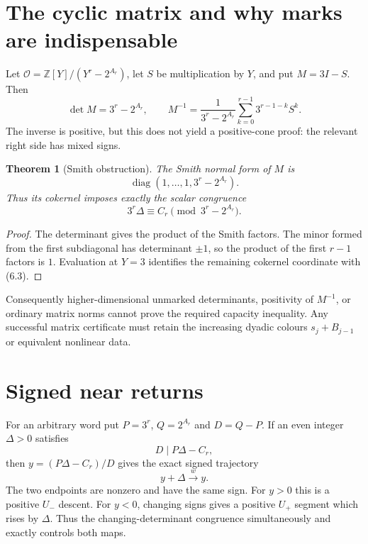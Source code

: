 \documentclass[11pt,reqno]{amsart}
\newtheorem{theorem}{Theorem}[section]
\theoremstyle{remark}
\newcommand{\Z}{\mathbb Z}
\newcommand{\Up}{U_{+}}
\newcommand{\Um}{U_{-}}
\begin{document}
\section{The cyclic matrix and why marks are indispensable}

Let $\mathcal O=\Z[Y]/(Y^r-2^{A_r})$, let $S$ be multiplication by $Y$,
and put $M=3I-S$.  Then
\[
 \det M=3^r-2^{A_r},\qquad
 M^{-1}=\frac1{3^r-2^{A_r}}
 \sum_{k=0}^{r-1}3^{r-1-k}S^k.                       \tag{6.1}
\]
The inverse is positive, but this does not yield a positive-cone proof: the
relevant right side has mixed signs.

\begin{theorem}[Smith obstruction]\label{thm:smith}
The Smith normal form of $M$ is
\[
 \operatorname{diag}(1,\ldots,1,3^r-2^{A_r}).        \tag{6.2}
\]
Thus its cokernel imposes exactly the scalar congruence
\[
 3^r\Delta\equiv C_r\pmod{3^r-2^{A_r}}.              \tag{6.3}
\]
\end{theorem}

\begin{proof}
The determinant gives the product of the Smith factors.  The minor formed
from the first subdiagonal has determinant $\pm1$, so the product of the
first $r-1$ factors is $1$.  Evaluation at $Y=3$ identifies the remaining
cokernel coordinate with (6.3).
\end{proof}

Consequently higher-dimensional unmarked determinants, positivity of
$M^{-1}$, or ordinary matrix norms cannot prove the required capacity
inequality.  Any successful matrix certificate must retain the increasing
dyadic colours $s_j+B_{j-1}$ or equivalent nonlinear data.

\section{Signed near returns}

For an arbitrary word put $P=3^r$, $Q=2^{A_r}$ and $D=Q-P$.  If
an even integer $\Delta>0$ satisfies
\[
 D\mid P\Delta-C_r,                                   \tag{7.1}
\]
then $y=(P\Delta-C_r)/D$ gives the exact signed trajectory
\[
 y+\Delta\xrightarrow{\,w\,}y.                       \tag{7.2}
\]
The two endpoints are nonzero and have the same sign.  For $y>0$ this is a
positive $\Um$ descent.  For $y<0$, changing signs gives a positive $\Up$
segment which rises by $\Delta$.  Thus the changing-determinant congruence
simultaneously and exactly controls both maps.
\end{document}
